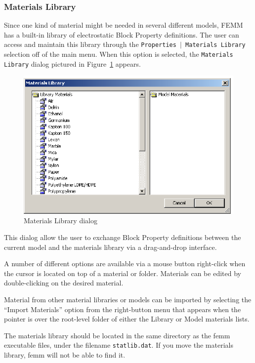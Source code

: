 \documentclass[12pt]{report}
\begin{document}
\subsubsection{Materials Library}

Since one kind of material might be needed in several different
models, FEMM has a built-in library of electrostatic Block Property definitions.
The user can access and maintain this library through the
\texttt{Properties $\vert $ Materials Library} selection off of the
main menu. When this option is selected, the
\texttt{Materials Library} dialog pictured in Figure~\ref{fig11} appears.

\begin{figure}[htbp]
\centerline{\includegraphics{bd_matlib.ps}}
\caption{Materials Library dialog}
\label{fig11}
\end{figure}

This dialog allow the user to exchange Block
Property definitions between the current model and the materials
library via a drag-and-drop interface.

A number of different options are available via a mouse button right-click
when the cursor is located on top of a material or folder. Materials can be edited
by double-clicking on the desired material.

Material from other material libraries or models can be imported by selecting the
``Import Materials'' option from the right-button menu that appears when the pointer
is over the root-level folder of either the Library or Model materials lists.

The materials library should be located in the same directory as
the femm executable files, under the filename \texttt{statlib.dat}.
If you move the materials library, femm will not be able to find
it.
\end{document}
